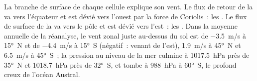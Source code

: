 La branche de surface de chaque cellule explique son vent. Le flux de retour de la  va vers l'équateur et est dévié vers l'ouest par la force de Coriolis~: les
. Le flux de surface de la  va vers le pôle et est dévié vers
l'est~: les . Dans la moyenne annuelle de la réanalyse, le vent zonal juste au-dessus du
sol est de \qty{-3.5}{m/s} à \ang{15}~N et de \qty{-4.4}{m/s} à \ang{15}~S (négatif~:
venant de l'est), \qty{+1.9}{m/s} à \ang{45}~N et \qty{+6.5}{m/s} à \ang{45}~S~; la
pression au niveau de la mer culmine à \qty{1017.5}{hPa} près de \ang{35}~N et \qty{1018.7}{hPa}
près de \ang{32}~S, et tombe à \qty{988}{hPa} à \ang{60}~S, le profond creux de
l'océan Austral.

